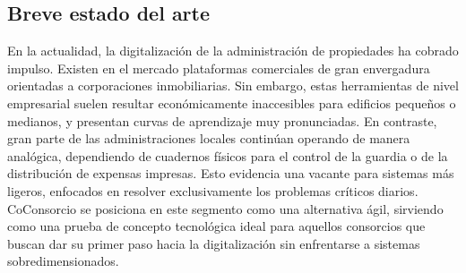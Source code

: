\subsection{Breve estado del arte}

En la actualidad, la digitalización de la administración de propiedades ha cobrado impulso. Existen en el mercado plataformas comerciales de gran envergadura orientadas a corporaciones inmobiliarias. Sin embargo, estas herramientas de nivel empresarial suelen resultar económicamente inaccesibles para edificios pequeños o medianos, y presentan curvas de aprendizaje muy pronunciadas. En contraste, gran parte de las administraciones locales continúan operando de manera analógica, dependiendo de cuadernos físicos para el control de la guardia o de la distribución de expensas impresas. Esto evidencia una vacante para sistemas más ligeros, enfocados en resolver exclusivamente los problemas críticos diarios. CoConsorcio se posiciona en este segmento como una alternativa ágil, sirviendo como una prueba de concepto tecnológica ideal para aquellos consorcios que buscan dar su primer paso hacia la digitalización sin enfrentarse a sistemas sobredimensionados.
